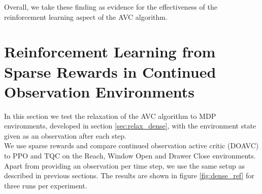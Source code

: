 Overall, we take these finding as evidence for the effectiveness of the reinforcement learning aspect of the AVC algorithm.


\section{Reinforcement Learning from Sparse Rewards in Continued Observation Environments}
\label{sec_exp_con_obs}
In this section we test the relaxation of the AVC algorithm to MDP environments, developed in section \ref{sec:relax_dense}, with the environment state given as an observation after each step. \\
We use sparse rewards 
and compare continued observation active critic (DOAVC) to PPO and TQC on the Reach, Window Open and Drawer Close environments. Apart from 
providing an observation per time step,
we use the same setup as described in previous sections. The results are shown in figure \ref{fig:dense_ref} for three runs per experiment.\\ 

